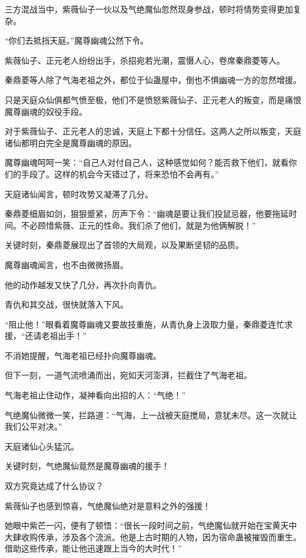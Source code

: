 
\begin{this_body}

三方混战当中，紫薇仙子一伙以及气绝魔仙忽然现身参战，顿时将情势变得更加复杂。

“你们去抵挡天庭。”魔尊幽魂公然下令。

紫薇仙子、正元老人纷纷出手，杀招宛若光潮，震慑人心，卷席秦鼎菱等人。

秦鼎菱等人除了气海老祖之外，都位于仙蛊屋中，倒也不惧幽魂一方的忽然增援。

只是天庭众仙俱都气愤至极，他们不是愤怒紫薇仙子、正元老人的叛变，而是痛恨魔尊幽魂的奴役手段。

对于紫薇仙子、正元老人的忠诚，天庭上下都十分信任。这两人之所以叛变，天庭诸仙都明白完全是魔尊幽魂的原因。

魔尊幽魂呵呵一笑：“自己人对付自己人，这种感觉如何？能否救下他们，就看你们的手段了。这样的机会今天错过了，将来恐怕不会再有。”

天庭诸仙闻言，顿时攻势又凝滞了几分。

秦鼎菱细眉如剑，狠狠蹙紧，厉声下令：“幽魂是要让我们投鼠忌器，他要拖延时间。不必顾惜紫薇、正元的性命。我们杀了他们，就是为他俩解脱！”

关键时刻，秦鼎菱展现出了首领的大局观，以及果断坚韧的品质。

魔尊幽魂闻言，也不由微微扬眉。

他的动作越发又快了几分，再次扑向青仇。

青仇和其交战，很快就落入下风。

“阻止他！”眼看着魔尊幽魂又要故技重施，从青仇身上汲取力量，秦鼎菱连忙求援，“还请老祖出手！”

不消她提醒，气海老祖已经扑向魔尊幽魂。

但下一刻，一道气流喷涌而出，宛如天河澎湃，拦截住了气海老祖。

气海老祖止住动作，凝神看向出招的人：“气绝！”

气绝魔仙微微一笑，拦路道：“气海，上一战被天庭搅局，意犹未尽。这一次就让我们公平对决。”

天庭诸仙心头猛沉。

关键时刻，气绝魔仙竟然是魔尊幽魂的援手！

双方究竟达成了什么协议？

紫薇仙子也感到惊喜，气绝魔仙绝对是意料之外的强援！

她眼中紫芒一闪，便有了顿悟：“很长一段时间之前，气绝魔仙就开始在宝黄天中大肆收购传承，涉及各个流派。他是上古时期的人物，因为宿命蛊被摧毁而重生。借助这些传承，能让他迅速跟上当今的大时代！”


\end{this_body}
